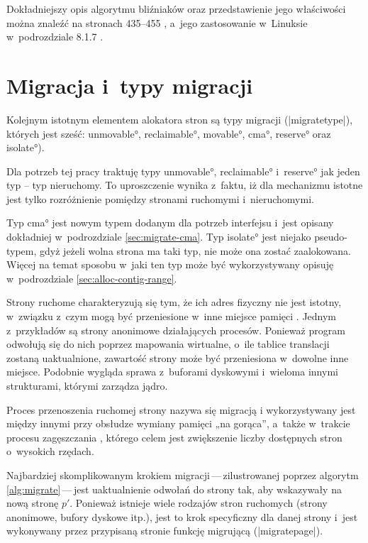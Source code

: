 Dokładniejszy opis algorytmu bliźniaków oraz przedstawienie jego
właściwości można znaleźć na stronach 435--455
\autocite{bib:taocp-fa}, a~jego zastosowanie w~Linuksie w~podrozdziale
8.1.7 \autocite{bib:utlk}.


\section{Migracja i~typy migracji}\label{sec:migratetype}

Kolejnym istotnym elementem alokatora stron są typy migracji
(\code|migratetype|), których jest sześć: \ang*{unmovable},
\ang*{reclaimable}, \ang*{movable}, \ang*{cma}, \ang*{reserve} oraz
\ang*{isolate}).

Dla potrzeb tej pracy traktuję typy \ang*{unmovable},
\ang*{reclaimable} i~\ang*{reserve} jak jeden typ -- typ nieruchomy.
To uproszczenie wynika z~faktu, iż dla mechanizmu  istotne jest
tylko rozróżnienie pomiędzy stronami ruchomymi i~nieruchomymi.

Typ \ang*{cma} jest nowym typem dodanym dla potrzeb interfejsu 
i~jest opisany dokładniej w~podrozdziale \ref{sec:migrate-cma}.  Typ
\ang*{isolate} jest niejako pseudo-typem, gdyż jeżeli wolna strona ma
taki typ, nie może ona zostać zaalokowana.  Więcej na temat sposobu
w~jaki ten typ może być wykorzystywany opisuję w~podrozdziale
\ref{sec:alloc-contig-range}.

Strony ruchome charakteryzują się tym, że ich adres fizyczny nie jest
istotny, w~związku z~czym mogą być przeniesione w~inne miejsce pamięci
.  Jednym z~przykładów są strony anonimowe działających procesów.
Ponieważ program odwołują się do nich poprzez mapowania wirtualne,
o~ile tablice translacji zostaną uaktualnione, zawartość strony może
być przeniesiona w~dowolne inne miejsce.  Podobnie wygląda sprawa
z~buforami dyskowymi i~wieloma innymi strukturami, którymi zarządza
jądro.

Proces przenoszenia ruchomej strony nazywa się migracją
i wykorzystywany jest między innymi przy obsłudze wymiany pamięci „na
gorąca”, a~także w~trakcie procesu zagęszczania
\autocite{bib:compaction, bib:supporting-large-contig-regions},
którego celem jest zwiększenie liczby dostępnych stron o~wysokich
rzędach.

Najbardziej skomplikowanym krokiem migracji\,---\,zilustrowanej
poprzez algorytm \ref{alg:migrate}\,---\,jest uaktualnienie odwołań do
strony tak, aby wskazywały na nową stronę $p'$.  Ponieważ istnieje
wiele rodzajów stron ruchomych (strony anonimowe, bufory dyskowe
itp.), jest to krok specyficzny dla danej strony i~jest wykonywany
przez przypisaną stronie funkcję migrującą (\code|migratepage|).

